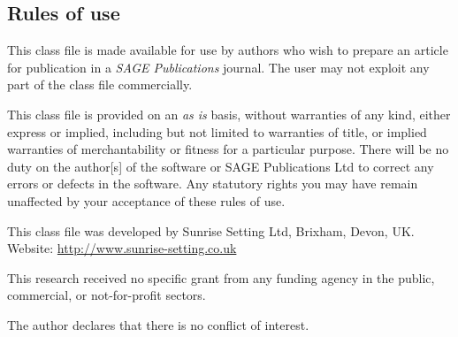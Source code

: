 \documentclass[sagev,times,Review]{sagej}
\begin{document}
\subsection{Rules of use}
This class file is made available for use by authors who wish to
prepare an article for publication in a \textit{SAGE Publications} journal.
The user may not exploit any
part of the class file commercially.

This class file is provided on an \textit{as is}  basis, without
warranties of any kind, either express or implied, including but
not limited to warranties of title, or implied  warranties of
merchantability or fitness for a particular purpose. There will
be no duty on the author[s] of the software or SAGE Publications Ltd
to correct any errors or defects in the software. Any
statutory  rights you may have remain unaffected by your
acceptance of these rules of use.

\begin{acks}
This class file was developed by Sunrise Setting Ltd,
Brixham, Devon, UK.\\
Website: \url{http://www.sunrise-setting.co.uk}
\end{acks}

\begin{funding}
This research received no specific grant from any funding agency in the public, commercial, or not-for-profit sectors.
\end{funding}

\begin{dci}
	The author declares that there is no conflict of interest.
\end{dci}




%
%
%
\end{document}

